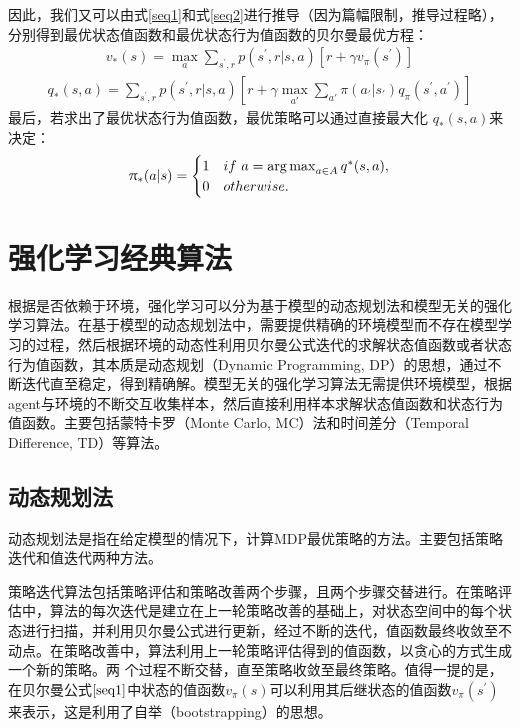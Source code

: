 因此，我们又可以由式\eqref{seq1}和式\eqref{seq2}进行推导（因为篇幅限制，推导过程略），分别得到最优状态值函数和最优状态行为值函数的贝尔曼最优方程：
\begin{equation}
\begin{aligned}
v_{*}(s)=\max_{a}\sum_{s^{'},r}p(s^{'},r|s,a)[r+\gamma v_{\pi}(s^{'})]
\end{aligned}
\end{equation}
\begin{equation}
\begin{aligned}
q_{*}(s,a)=\sum_{s^{'},r}p(s^{'},r|s,a)[r+\gamma \max_{a'} {\sum_{a'}\pi(a_{'}|s_{'})} q_{\pi}(s^{'},a^{'})]
\end{aligned}
\end{equation}
最后，若求出了最优状态行为值函数，最优策略可以通过直接最大化 $q_{*}(s,a)$来决定：
\begin{equation}
\begin{aligned}
\uppi_{*}(a|s) = 
    \begin{cases}
        1 & if \ a=\operatorname*{arg\,max}_{a\in A}q^{*}(s,a),\\
        0 & otherwise.
    \end{cases}
\end{aligned}
\end{equation}

\section{强化学习经典算法}
根据是否依赖于环境，强化学习可以分为基于模型的动态规划法和模型无关的强化学习算法。在基于模型的动态规划法中，需要提供精确的环境模型而不存在模型学习的过程，然后根据环境的动态性利用贝尔曼公式迭代的求解状态值函数或者状态行为值函数，其本质是动态规划（Dynamic Programming, DP）的思想，通过不断迭代直至稳定，得到精确解。模型无关的强化学习算法无需提供环境模型，根据agent与环境的不断交互收集样本，然后直接利用样本求解状态值函数和状态行为值函数。主要包括蒙特卡罗（Monte Carlo, MC）法和时间差分（Temporal Difference, TD）等算法。

\subsection{动态规划法}
动态规划法是指在给定模型的情况下，计算MDP最优策略的方法。主要包括策略迭代和值迭代两种方法。

策略迭代算法包括策略评估和策略改善两个步骤，且两个步骤交替进行。在策略评估中，算法的每次迭代是建立在上一轮策略改善的基础上，对状态空间中的每个状态进行扫描，并利用贝尔曼公式进行更新，经过不断的迭代，值函数最终收敛至不动点。在策略改善中，算法利用上一轮策略评估得到的值函数，以贪心的方式生成一个新的策略。两
个过程不断交替，直至策略收敛至最终策略。值得一提的是，在贝尔曼公式$\eqref{seq1}$中状态的值函数$v_{\pi}(s)$可以利用其后继状态的值函数$v_{\pi}(s^{'})$来表示，这是利用了自举（bootstrapping）的思想。

